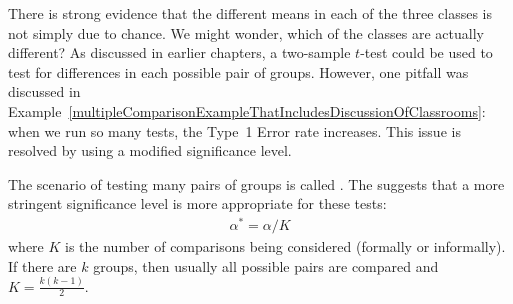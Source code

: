 There is strong evidence that the different means in each of the three classes is not simply due to chance. We might wonder, which of the classes are actually different? As discussed in earlier chapters, a two-sample $t$-test could be used to test for differences in each possible pair of groups. However, one pitfall was discussed in Example~\vref{multipleComparisonExampleThatIncludesDiscussionOfClassrooms}: when we run so many tests, the Type~1 Error rate increases. This issue is resolved by using a modified significance level.

\begin{termBox}{
The scenario of testing many pairs of groups is called . The  suggests that a more stringent significance level is more appropriate for these tests:
\begin{align*}
\alpha^* = \alpha / K
\end{align*}
where $K$ is the number of comparisons being considered (formally or informally). If there are $k$ groups, then usually all possible pairs are compared and $K=\frac{k(k-1)}{2}$.}
\end{termBox}

